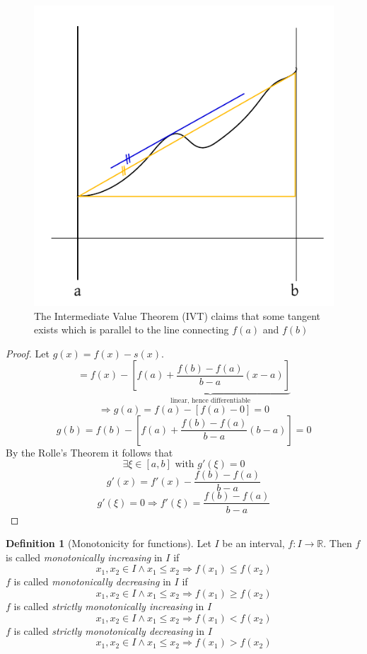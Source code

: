 \documentclass[a4paper,landscape,twocolumn]{article}
\theoremstyle{definition}
\newtheorem{defi}{Definition}
\begin{document}
\begin{figure}[!h]
  \begin{center}
    \includegraphics{img/intermediate_value_theorem.pdf}
    \caption{The Intermediate Value Theorem (IVT) claims that some tangent exists which is parallel to the line connecting $f(a)$ and $f(b)$}
  \end{center}
\end{figure}
%
\begin{proof}
  Let $g(x) = f(x) - s(x)$.
  \[ = f(x) - \underbrace{\left[f(a) + \frac{f(b) - f(a)}{b - a} (x - a)\right]}_{\text{linear, hence differentiable}} \]
  \[ \Rightarrow g(a) = f(a) - [f(a) - 0] = 0 \]
  \[ g(b) = f(b) - \left[f(a) + \frac{f(b) - f(a)}{b - a} (b - a)\right] = 0 \]
  By the Rolle's Theorem it follows that
  \[ \exists \xi \in [a,b] \text{ with } g'(\xi) = 0 \]
  \[ g'(x) = f'(x) - \frac{f(b) - f(a)}{b - a} \]
  \[ g'(\xi) = 0 \Rightarrow f'(\xi) = \frac{f(b) - f(a)}{b - a} \]
\end{proof}
%
\begin{defi}[Monotonicity for functions]
  Let $I$ be an interval, $f: I \to \mathbb R$. Then $f$ is called \emph{monotonically increasing} in $I$ if
  \[ x_1, x_2 \in I \land x_1 \leq x_2 \Rightarrow f(x_1) \leq f(x_2) \]
  $f$ is called \emph{monotonically decreasing} in $I$ if
  \[ x_1, x_2 \in I \land x_1 \leq x_2 \Rightarrow f(x_1) \geq f(x_2) \]
  $f$ is called \emph{strictly monotonically increasing} in $I$
  \[ x_1, x_2 \in I \land x_1 \leq x_2 \Rightarrow f(x_1) < f(x_2) \]
  $f$ is called \emph{strictly monotonically decreasing} in $I$
  \[ x_1, x_2 \in I \land x_1 \leq x_2 \Rightarrow f(x_1) > f(x_2) \]
\end{defi}
\end{document}
